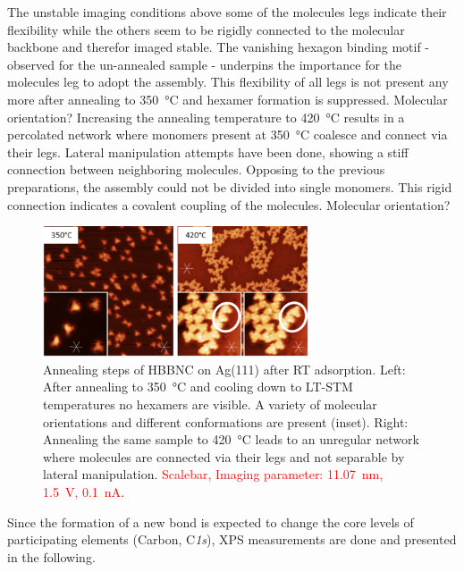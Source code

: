 The unstable imaging conditions above some of the molecules legs indicate their flexibility while the others seem to be rigidly connected to the molecular backbone and therefor imaged stable. The vanishing hexagon binding motif - observed for the un-annealed sample - underpins the importance for the molecules leg to adopt the assembly. This flexibility of all legs is not present any more after annealing to \SI{350}{\celsius} and hexamer formation is suppressed. Molecular orientation?
Increasing the annealing temperature to \SI{420}{\celsius} results in a percolated network where monomers present at \SI{350}{\celsius} coalesce and connect via their legs. Lateral manipulation attempts have been done, showing a stiff connection between neighboring molecules. Opposing to the previous preparations, the assembly could not be divided into single monomers. This rigid connection indicates a covalent coupling of the molecules. 
Molecular orientation?

\begin{figure}[] \centering
	\includegraphics[width=0.7\textwidth]{./images/hbbnc-ag-111-annealed}
	\caption{Annealing steps of HBBNC on Ag(111) after RT adsorption. Left: After annealing to \SI{350}{\celsius} and cooling down to LT-STM temperatures no hexamers are visible. A variety of molecular orientations and different conformations are present (inset). Right: Annealing the same sample to \SI{420}{\celsius} leads to an unregular network where molecules are connected via their legs and not separable by lateral manipulation. \textcolor{red}{Scalebar, Imaging parameter: \SI{11.07}{\nano \meter}, \SI{1.5}{\volt}, \SI{0.1}{\nano \ampere}}.}
	\label{}
\end{figure}

Since the formation of a new bond is expected to change the core levels of participating elements (Carbon, C\textit{1s}), XPS measurements are done and presented in the following.

